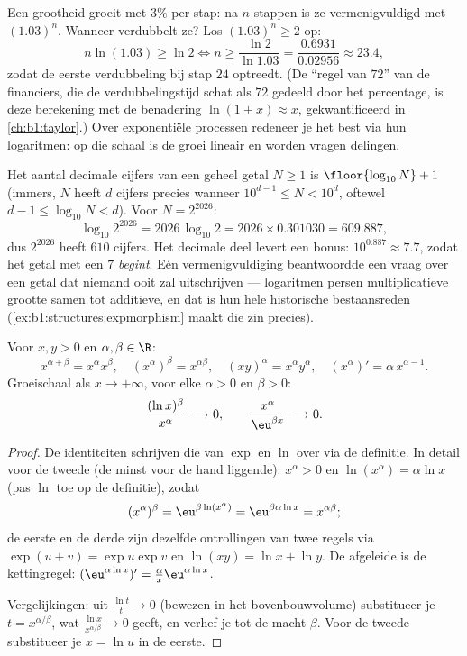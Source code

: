 \begin{example}[Verdubbelingstijden]\label{ex:b1:functions:doubling}
Een grootheid groeit met $3\%$ per stap: na $n$ stappen is ze
vermenigvuldigd met $(1.03)^n$. Wanneer verdubbelt ze? Los $(1.03)^n
\geq 2$ op:
\[
n\ln(1.03) \geq \ln2
\iff n \geq \frac{\ln 2}{\ln 1.03}
= \frac{0.6931}{0.02956} \approx 23.4 ,
\]
zodat de eerste verdubbeling bij stap $24$ optreedt. (De ``regel van
$72$'' van de financiers, die de verdubbelingstijd schat als $72$
gedeeld door het percentage, is deze berekening met de benadering
$\ln(1 + x) \approx x$, gekwantificeerd in \cref{ch:b1:taylor}.) Over
exponentiële processen redeneer je het best via hun logaritmen: op die
schaal is de groei lineair en worden vragen delingen.
\end{example}

\begin{example}\label{ex:b1:functions:digits}
Het aantal decimale cijfers van een geheel getal $N \geq 1$ is
$\floor{\log_{10} N} + 1$ (immers, $N$ heeft $d$ cijfers precies
wanneer $10^{d-1} \leq N < 10^d$, oftewel $d - 1 \leq \log_{10}N < d$).
Voor $N = 2^{2026}$:
\[
\log_{10} 2^{2026} = 2026\,\log_{10}2
= 2026 \times 0.301030 = 609.887 ,
\]
dus $2^{2026}$ heeft $610$ cijfers. Het decimale deel levert een bonus:
$10^{0.887} \approx 7.7$, zodat het getal met een $7$ \emph{begint}.
Eén vermenigvuldiging beantwoordde een vraag over een getal dat niemand
ooit zal uitschrijven --- logaritmen persen multiplicatieve grootte
samen tot additieve, en dat is hun hele historische bestaansreden
(\cref{ex:b1:structures:expmorphism} maakt die zin precies).
\end{example}

\begin{proposition}\label{prop:b1:functions:powerrules}
Voor $x, y > 0$ en $\alpha, \beta \in \R$:
\[
x^{\alpha+\beta} = x^\alpha x^\beta, \quad
(x^\alpha)^\beta = x^{\alpha\beta}, \quad
(xy)^\alpha = x^\alpha y^\alpha, \quad
(x^\alpha)' = \alpha\, x^{\alpha - 1}.
\]
Groeischaal als $x \to +\infty$, voor elke
$\alpha > 0$ en $\beta > 0$:
\[
\frac{(\ln x)^\beta}{x^\alpha} \longrightarrow 0,
\qquad
\frac{x^\alpha}{\eu^{\beta x}} \longrightarrow 0 .
\]
\end{proposition}

\begin{proof}
De identiteiten schrijven die van $\exp$ en $\ln$ over via de definitie.
In detail voor de tweede (de minst voor de hand liggende): $x^\alpha > 0$
en $\ln(x^\alpha) = \alpha\ln x$ (pas $\ln$ toe op de definitie), zodat
\[
(x^\alpha)^\beta = \eu^{\beta\ln(x^\alpha)}
= \eu^{\beta\alpha\ln x} = x^{\alpha\beta} ;
\]
de eerste en de derde zijn dezelfde ontrollingen van twee regels via
$\exp(u + v) = \exp u\exp v$ en $\ln(xy) = \ln x + \ln y$. De afgeleide
is de kettingregel: $(\eu^{\alpha\ln x})' = \frac{\alpha}{x}
\eu^{\alpha\ln x}$.

Vergelijkingen: uit $\frac{\ln t}{t} \to 0$ (bewezen in het
bovenbouwvolume) substitueer je $t = x^{\alpha/\beta}$, wat $\frac{\ln
x}{x^{\alpha/\beta}} \to 0$ geeft, en verhef je tot de macht $\beta$.
Voor de tweede substitueer je $x = \ln u$ in de eerste.
\end{proof}

